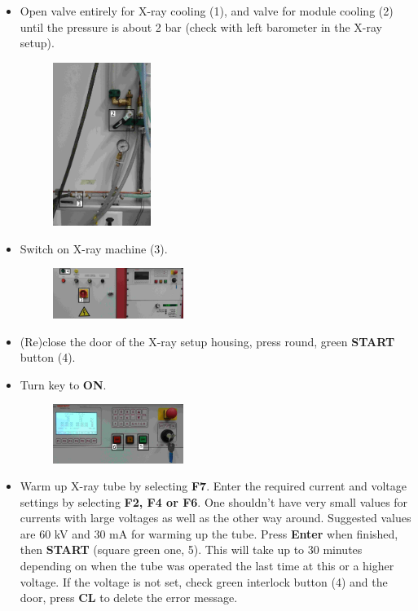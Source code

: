\documentclass[fleqn,10pt]{SelfArx} %
\begin{document}
\begin{itemize}
\item {Open valve entirely for X-ray cooling (1), and valve for module cooling (2) until the pressure is about 2 bar (check with left barometer in the X-ray setup).
\begin{figure} [h!] \centering 
\includegraphics[width=0.3\textwidth, angle=0] {./graphics/Water.jpg}
\end{figure}
}
\item {Switch on X-ray machine (3).
\begin{figure} [h!] \centering 
\includegraphics[width=0.4\textwidth, angle=0] {./graphics/Full2.jpg}
\end{figure}
}
\item {(Re)close the door of the X-ray setup housing, press round, green \textbf{START} button (4).}
\item {Turn key to \textbf{ON}.
\begin{figure} [h!] \centering 
\includegraphics[width=0.4\textwidth, angle=0] {./graphics/CommandBoard2.jpg}
\end{figure}
}
\item{Warm up X-ray tube by selecting \textbf{F7}. Enter the required current and voltage settings by selecting \textbf{F2, F4 or F6}. One shouldn't have very small values for currents with large voltages as well as the other way around. Suggested values are 60 kV and 30 mA for warming up the tube. Press \textbf{Enter} when finished, then \textbf{START} (square green one, 5). This will take up to 30 minutes depending on when the tube was operated the last time at this or a higher voltage. If the voltage is not set, check green interlock button (4) and the door, press \textbf{CL} to delete the error message.}

\end{itemize}
\end{document}
